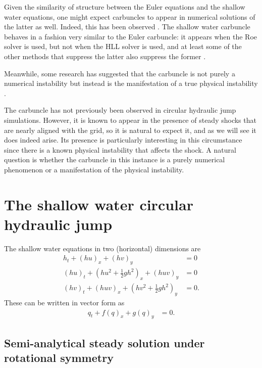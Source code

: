 \documentclass{article}
\begin{document}
Given the similarity of structure between the Euler equations and the shallow
water equations, one might expect carbuncles to appear in numerical
solutions of the latter as well.  Indeed, this has been observed \cite{kemm2014note}.
The shallow water carbuncle behaves in a fashion very similar to the
Euler carbuncle: it appears when the Roe solver is used, but not when
the HLL solver is used, and at least some of the other methods that suppress
the latter also suppress the former \cite{kemm2014note,bader2014carbuncle}.

Meanwhile, some research has suggested that the carbuncle is not purely a
numerical instability but instead is the manifestation of a true physical
instability \cite{moschetta2001carbuncle,elling2009carbuncle}.

The carbuncle has not previously been observed in circular hydraulic jump
simulations.  However, it is known to appear in the presence of steady shocks
that are nearly aligned with the grid, so it is natural to expect it, and as we
will see it does indeed arise.  Its presence is particularly interesting 
in this circumstance since there is a known physical instability that affects
the shock.  A natural question is whether the carbuncle in this instance is
a purely numerical phenomenon or a manifestation of the physical instability.

\section{The shallow water circular hydraulic jump}
The shallow water equations in two (horizontal) dimensions are
\begin{subequations} \label{eq:sw}
\begin{align}
    h_t + (hu)_x + (hv)_y & = 0 \\
    (hu)_t + \left(hu^2 + \frac{1}{2}gh^2\right)_x + (huv)_y & = 0 \\
    (hv)_t + (huv)_x + \left(hv^2 + \frac{1}{2}gh^2\right)_y & = 0.
\end{align}
\end{subequations}
These can be written in vector form as
\begin{align}
    q_t + f(q)_x + g(q)_y & = 0.
\end{align}

\subsection{Semi-analytical steady solution under rotational symmetry}
\end{document}
